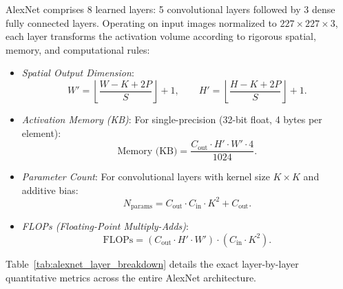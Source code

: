 AlexNet comprises 8 learned layers: 5 convolutional layers followed by 3 dense fully connected layers. Operating on input images normalized to $227 \times 227 \times 3$, each layer transforms the activation volume according to rigorous spatial, memory, and computational rules:
\begin{itemize}[leftmargin=*]
  \item \textit{Spatial Output Dimension}:
    \begin{equation}
    W' = \left\lfloor \frac{W - K + 2P}{S} \right\rfloor + 1, \qquad H' = \left\lfloor \frac{H - K + 2P}{S} \right\rfloor + 1.
    \end{equation}
  \item \textit{Activation Memory (KB)}: For single-precision (32-bit float, 4 bytes per element):
    \begin{equation}
    \text{Memory (KB)} = \frac{C_{\text{out}} \cdot H' \cdot W' \cdot 4}{1024}.
    \end{equation}
  \item \textit{Parameter Count}: For convolutional layers with kernel size $K \times K$ and additive bias:
    \begin{equation}
    N_{\text{params}} = C_{\text{out}} \cdot C_{\text{in}} \cdot K^2 + C_{\text{out}}.
    \end{equation}
  \item \textit{FLOPs (Floating-Point Multiply-Adds)}:
    \begin{equation}
    \text{FLOPs} = (C_{\text{out}} \cdot H' \cdot W') \cdot (C_{\text{in}} \cdot K^2).
    \end{equation}
\end{itemize}

Table~\ref{tab:alexnet_layer_breakdown} details the exact layer-by-layer quantitative metrics across the entire AlexNet architecture.

